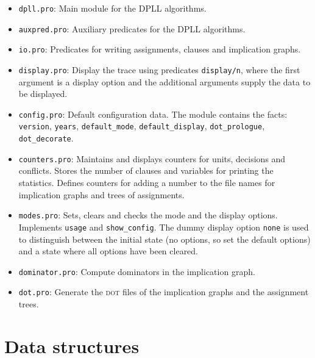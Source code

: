 \documentclass[11pt]{article}
\newcommand*{\p}[1]{\textup{\texttt{#1}}}
\newcommand*{\dt}{\textsc{dot}}
\begin{document}
\begin{itemize}
\item \p{dpll.pro}: Main module for the DPLL algorithms.

\item \p{auxpred.pro}: Auxiliary predicates for the DPLL algorithms. 

\item \p{io.pro}: Predicates for writing assignments, clauses and
implication graphs.

\item \p{display.pro}: Display the trace using predicates \p{display/n},
where the first argument is a display option and the additional
arguments supply the data to be displayed.

\item \p{config.pro}: Default configuration data. The module contains
the facts: \p{version}, \p{years}, \p{default\_mode},
\p{default\_display}, \p{dot\_prologue}, \p{dot\_decorate}.

\item \p{counters.pro}: Maintains and displays counters for units,
decisions and conflicts. Stores the number of clauses and variables for
printing the statistics. Defines counters for adding a number to the
file names for implication graphs and trees of assignments.

\item \p{modes.pro}: Sets, clears and checks the mode and the display
options. Implements \p{usage} and \p{show\_config}. The dummy
display option \p{none} is used to distinguish between the initial state
(no options, so set the default options) and a state where all options
have been cleared.

\item \p{dominator.pro}: Compute dominators in the implication graph. 

\item \p{dot.pro}: Generate the \dt{} files of the implication graphs
and the assignment trees.
\end{itemize}

\section{Data structures}
\end{document}
